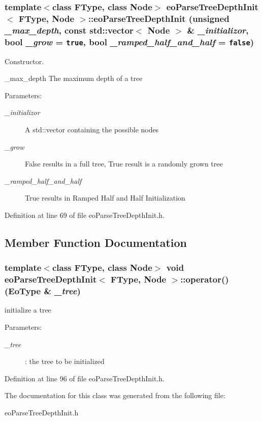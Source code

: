 \subsubsection{\setlength{\rightskip}{0pt plus 5cm}template$<$class FType, class Node$>$ {\bf eo\-Parse\-Tree\-Depth\-Init}$<$ FType, Node $>$::{\bf eo\-Parse\-Tree\-Depth\-Init} (unsigned {\em \_\-max\_\-depth}, const std::vector$<$ Node $>$ \& {\em \_\-initializor}, bool {\em \_\-grow} = {\tt true}, bool {\em \_\-ramped\_\-half\_\-and\_\-half} = {\tt false})\hspace{0.3cm}{\tt  [inline]}}\label{classeo_parse_tree_depth_init_a0}


Constructor. 

\_\-max\_\-depth The maximum depth of a tree \begin{Desc}
\item[Parameters:]
\begin{description}
\item[{\em \_\-initializor}]A std::vector containing the possible nodes \item[{\em \_\-grow}]False results in a full tree, True result is a randomly grown tree \item[{\em \_\-ramped\_\-half\_\-and\_\-half}]True results in Ramped Half and Half Initialization \end{description}
\end{Desc}


Definition at line 69 of file eo\-Parse\-Tree\-Depth\-Init.h.

\subsection{Member Function Documentation}
\subsubsection{\setlength{\rightskip}{0pt plus 5cm}template$<$class FType, class Node$>$ void {\bf eo\-Parse\-Tree\-Depth\-Init}$<$ FType, Node $>$::operator() ({\bf Eo\-Type} \& {\em \_\-tree})\hspace{0.3cm}{\tt  [inline]}}\label{classeo_parse_tree_depth_init_a2}


initialize a tree 

\begin{Desc}
\item[Parameters:]
\begin{description}
\item[{\em \_\-tree}]: the tree to be initialized \end{description}
\end{Desc}


Definition at line 96 of file eo\-Parse\-Tree\-Depth\-Init.h.

The documentation for this class was generated from the following file:\begin{CompactItemize}
\item 
eo\-Parse\-Tree\-Depth\-Init.h\end{CompactItemize}
